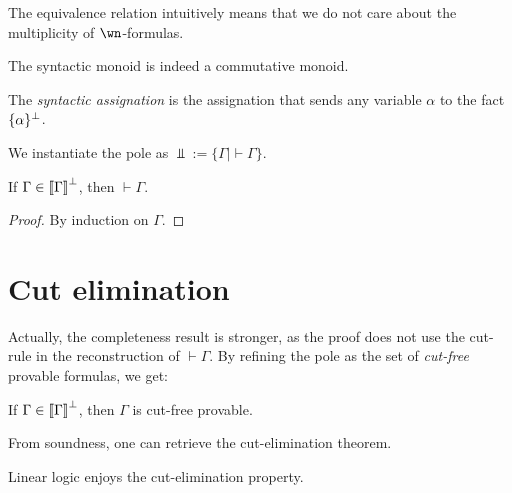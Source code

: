 The equivalence relation intuitively means that we do not care about the
multiplicity of \(\wn\)-formulas.

\begin{lemma}
The syntactic monoid is indeed a commutative monoid.
\end{lemma}

\begin{definition}
The \emph{syntactic assignation} is the assignation that sends any variable $\alpha$ to the fact $\{\alpha\}^\bot$.
\end{definition}

We instantiate the pole as \(\Bot := \{\Gamma \mid \vdash\Gamma\}\).

\begin{theorem}
If $\Gamma\in\left\llbracket \Gamma\right\rrbracket^\bot$, then $\vdash\Gamma$.
\end{theorem}

\begin{proof}
By induction on $\Gamma$.
\end{proof}

\section{Cut elimination}\label{cut-elimination}

Actually, the completeness result is stronger, as the proof does not use
the cut-rule in the reconstruction of \(\vdash\Gamma\). By refining the
pole as the set of \emph{cut-free} provable formulas, we get:

\begin{theorem}
If $\Gamma\in\left\llbracket \Gamma\right\rrbracket^\bot$, then $\Gamma$ is cut-free provable.
\end{theorem}

From soundness, one can retrieve the cut-elimination theorem.

\begin{corollary}
Linear logic enjoys the cut-elimination property.
\end{corollary}



